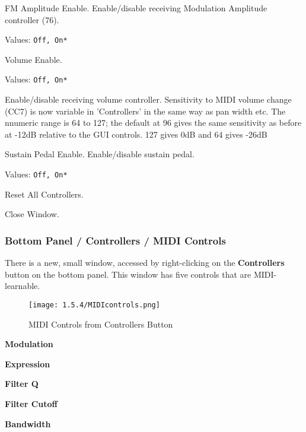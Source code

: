    FM Amplitude Enable.
   Enable/disable receiving Modulation Amplitude controller (76).

   Values: \texttt{Off, On*}

   Volume Enable.

   Values: \texttt{Off, On*}

   Enable/disable receiving volume controller.
   Sensitivity to MIDI volume change (CC7) is now variable in 'Controllers'
   in the same way as pan width etc. The nnumeric range is 64 to 127; the
   default at 96 gives the same sensitivity as before at -12dB relative to
   the GUI controls. 127 gives 0dB and 64 gives -26dB

   Sustain Pedal Enable.
   Enable/disable sustain pedal.

   Values: \texttt{Off, On*}

   Reset All Controllers.

   Close Window.

\subsubsection{Bottom Panel / Controllers / MIDI Controls}
\label{subsubsec:bottom_panel_controllers_midi_controls}

   There is a new, small window, accessed by right-clicking on
   the \textbf{Controllers} button on the bottom panel.
   This window has five controls that are MIDI-learnable.

\begin{figure}[H]
   \centering 
   \texttt{[image: 1.5.4/MIDIcontrols.png]}
   \caption{MIDI Controls from Controllers Button}
   \label{fig:instrument_midi_controllers}
\end{figure}

   \begin{enumber}
      \item \textbf{Modulation}
      \item \textbf{Expression}
      \item \textbf{Filter Q}
      \item \textbf{Filter Cutoff}
      \item \textbf{Bandwidth}
   \end{enumber}

   \setcounter{ItemCounter}{0}      %

